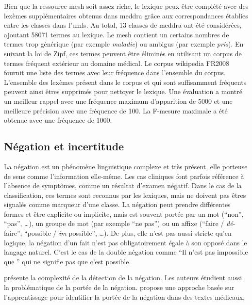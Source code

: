Bien que la ressource \gls{mesh} soit assez riche, le lexique peux être complété avec des lexèmes supplémentaires obtenus dans \gls{meddra} grâce aux correspondances établies entre les classes dans l'\gls{umls}.
Au total, \num{13} classes de \gls{meddra} ont été considérées, ajoutant \num{58071} termes au lexique.
Le \gls{mesh} contient un certains nombres de termes trop générique (par exemple \emph{maladie}) ou ambigus (par exemple \emph{pris}).
En suivant la loi de Zipf, ces termes peuvent être éliminés en utilisant un corpus de termes fréquent extérieur au domaine médical.
Le corpus \gls{wikipedia} FR2008 \cite{REDACCorpusTexte} fournit une liste des termes avec leur fréquence dans l'ensemble du corpus.
L'ensemble des lexèmes présent dans le corpus et qui sont suffisamment fréquents peuvent ainsi êtres supprimés pour nettoyer le lexique.
Une évaluation a montré un meilleur rappel avec une fréquence maximum d'apparition de \num{5000} et une meilleure précision avec une fréquence de \num{100}.
La F-mesure maximale a été obtenue avec une fréquence de \num{1000}.

\subsection{Négation et incertitude}
\label{sec:class:neg}
La négation est un phénomène linguistique complexe et très présent, elle porteuse de sens comme l'information elle-même.
Les cas cliniques font parfois référence à l'absence de symptômes, comme un résultat d'examen négatif.
Dans le cas de la classification, ces termes sont reconnus par les lexiques, mais ne doivent pas êtres signalés comme marqueur d'une classe.
La négation peut prendre différentes formes et être explicite ou implicite, mais est souvent portée par un mot (\enquote{non}, \enquote{pas}, \dots), un groupe de mot (par exemple \enquote{ne \textelp{} pas}) ou un affixe (\enquote{faire / \emph{dé}-faire}, \enquote{possible / \emph{im}-possible}, \dots).
De plus, elle n'est pas aussi stricte qu'en logique, la négation d'un fait n'est pas obligatoirement égale à son opposé dans le langage naturel.
C'est le cas de la double négation comme \enquote{Il n'est pas impossible que \textelp{}} qui ne signifie pas que c'est possible.

\cite{blancoIssuesDetectingNegation2011} présente la complexité de la détection de la négation.
Les auteurs étudient aussi la problématique de la portée de la négation.
\cite{moranteLearningScopeNegation2008} propose une approche basée sur l'apprentissage pour identifier la portée de la négation dans des textes médicaux.

